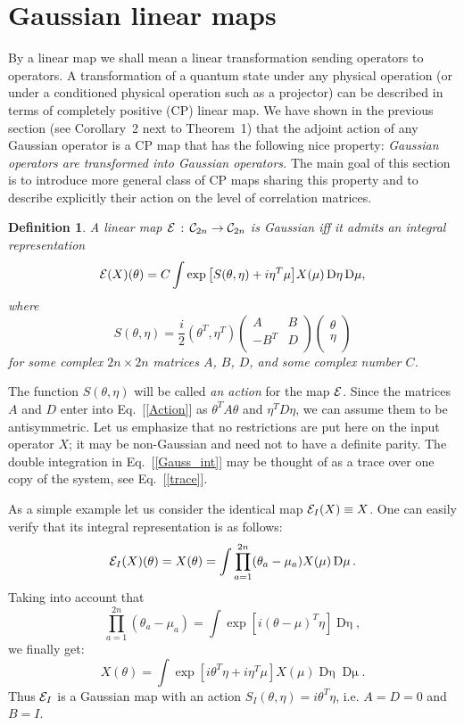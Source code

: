 \documentclass[twocolumn,showpacs,preprintnumbers,superscriptaddress]{revtex4}
\newtheorem{dfn}{Definition}
\newcommand{\calE}{{\cal E }}
\newcommand{\Clif}{{\cal C}}
\newcommand{\D}[1]{\mathop{\mathrm{D}#1}}
\newcommand{\be}{\begin{equation}}
\newcommand{\ee}{\end{equation}}
\newcommand{\ba}{\begin{array}}
\newcommand{\ea}{\end{array}}
\begin{document}
\section{Gaussian linear maps}
\label{sec:maps}

By a linear map we shall mean a linear transformation sending operators
to operators.
A transformation of a quantum state under any 
physical operation (or under a conditioned physical operation such as
a projector) can be described in terms of completely positive (CP) linear
map.  We have shown in the previous section (see Corollary~2
next to Theorem~1) that the adjoint action of any Gaussian operator
is a CP map that has the following nice property: {\it Gaussian operators 
are transformed into Gaussian operators.} 
The main goal of this section is to introduce more general
class of CP maps sharing this property and to describe explicitly
their action on the level of correlation matrices.


\begin{dfn}
\label{def:Gauss_int}
A linear map $\calE \, : \, \Clif_{2n} \to \Clif_{2n}$ is 
Gaussian iff it admits an integral  representation
\be\label{Gauss_int}
\calE(X)(\theta) = C \int \exp{\left[ S(\theta,\eta) + i\eta^T \mu \right]}
X(\mu) \D{\eta}\D{\mu},
\ee
where
\be\label{Action}
S(\theta,\eta)= \frac{i}2 (\theta^T,\eta^T)
\left( \ba{cc} A & B \\ -B^T & D \\ \ea \right)
\left( \ba{c} \theta \\ \eta \\ \ea \right)
\ee
for some complex  $2n\times 2n$ matrices $A$, $B$, $D$, and some
complex number $C$.
\end{dfn}
The function $S(\theta,\eta)$ will be called {\it an action} for the map $\calE$.
Since the matrices $A$ and $D$ enter into Eq.~[\ref{Action}]
as $\theta^T A \theta$ and $\eta^T D \eta$, we can assume them to be
antisymmetric. Let us emphasize that no restrictions are put here on the input
operator $X$; it may be non-Gaussian and need not to have a definite
parity. The double integration in Eq.~[\ref{Gauss_int}] may be thought of as
a trace over one copy of the system, see Eq.~[\ref{trace}].
 

As a simple example  let us consider the identical map
$\calE_I(X)\equiv X$. One can easily verify that its integral representation
is as follows:
\[
\calE_I(X)(\theta)=X(\theta) = 
\int \prod_{a=1}^{2n} (\theta_a - \mu_a) X(\mu) \D{\mu}.
\]
Taking into account that 
\be\label{delta-kernel}
\prod_{a=1}^{2n} (\theta_a - \mu_a) = 
\int \exp{\left[ i(\theta - \mu)^T \eta \right]} \D{\eta},
\ee
we finally get:
\[
X(\theta) = 
\int 
\exp{ \left[ i\theta^T \eta + i\eta^T \mu \right]} X(\mu) \D{\eta} \D{\mu}.
\]
Thus  $\calE_I$ is a Gaussian map with an action 
$S_I(\theta,\eta)=i\theta^T \eta$,
i.e.  $A=D=0$ and $B=I$.
\end{document}
